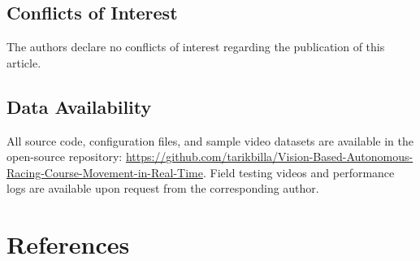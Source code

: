 \documentclass[twocolumn]{article}
\begin{document}
\subsection*{Conflicts of Interest}
The authors declare no conflicts of interest regarding the publication of this article.

\subsection*{Data Availability}
All source code, configuration files, and sample video datasets are available in the open-source repository: \href{https://github.com/tarikbilla/Vision-Based-Autonomous-Racing-Course-Movement-in-Real-Time}{https://github.com/tarikbilla/Vision-Based-Autonomous-Racing-Course-Movement-in-Real-Time}. Field testing videos and performance logs are available upon request from the corresponding author.

\section*{References}
\nocite{*}
\printbibliography[heading=none]
\end{document}
